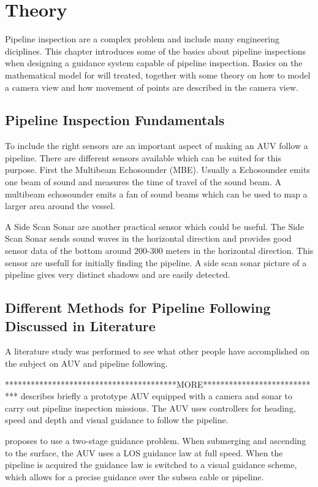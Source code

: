\chapter{Theory}
	Pipeline inspection are a complex problem and include many engineering diciplines.
	This chapter introduces some of the basics about pipeline inspections when
	designing a guidance system capable of pipeline inspection. Basics on the mathematical model for
	\hugin will treated, together with some theory on how to model a camera view and how
	movement of points are described in the camera view.

\section{Pipeline Inspection Fundamentals}
	
	
	To include the right sensors are an important aspect of making an AUV follow a pipeline. There are
	different sensors available which can be suited for this purpose. First the Multibeam Echosounder
	(MBE). Usually a Echosounder emits one beam of sound and measures the time of travel of the sound
	beam. A multibeam echosounder emits a fan of sound beams which can be used to map a larger area around
	the vessel.

	A Side Scan Sonar are another practical sensor which could be useful. The Side Scan Sonar sends sound
	waves in the horizontal direction and provides good sensor data of the bottom around 200-300 meters in
	the horizontal direction. This sensor are usefull for initially finding the pipeline. A side scan
	sonar picture of a pipeline gives very distinct shadows and are easily detected. 

	
\section{Different Methods for Pipeline Following Discussed in Literature}
	A literature study was performed to see what other people have accomplished on the subject on AUV and 
	pipeline following. 
	
	****************************************MORE****************************
	\cite{piscis} describes briefly a prototype AUV equipped with a camera and sonar to carry out pipeline
	inspection missions. The AUV uses controllers for heading, speed and depth and visual guidance to
	follow the pipeline. 
	
	\cite{GuidanceReview} proposes to use a two-stage guidance problem. When submerging and ascending to the surface, 
	the AUV uses a LOS guidance law at full speed. When the pipeline is acquired the guidance law is
	switched to a visual guidance scheme, which allows for a precise guidance over the subsea cable or
	pipeline. 
		
